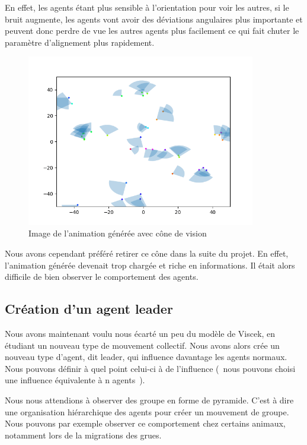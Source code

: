 \documentclass[french, a4paper, 12pt, openany]{report}
\begin{document}
		En effet, les agents étant plus sensible à l'orientation pour voir les autres, si le bruit augmente, les agents vont avoir des déviations angulaires plus importante et peuvent donc perdre de vue les autres agents plus facilement ce qui fait chuter le paramètre d'alignement plus rapidement.
	
	
   \begin{figure}[!h]
		\centering
		\includegraphics[width=10cm]{images/image_12.png}
		\caption{Image de l'animation générée avec cône de vision}
		\label{cone_vision}
	\end{figure}  
  
    Nous avons cependant préféré retirer ce cône dans la suite du projet. En effet, l'animation générée devenait trop chargée et riche en informations. Il était alors difficile de bien observer le comportement des agents.
    
    \subsection{Création d'un agent leader}
       
       Nous avons maintenant voulu nous écarté un peu du modèle de Viscek, en étudiant un nouveau type de mouvement collectif. Nous avons alors crée un nouveau type d'agent, dit leader, qui influence davantage les agents normaux. Nous pouvons définir à quel point celui-ci à de l'influence (~nous pouvons choisi une influence équivalente à n agents~).
       
       Nous nous attendions à observer des groupe en forme de pyramide. C'est à dire une organisation hiérarchique des agents pour créer un mouvement de groupe. Nous pouvons par exemple observer ce comportement chez certains animaux, notamment lors de la migrations des grues. 
       
\end{document}
